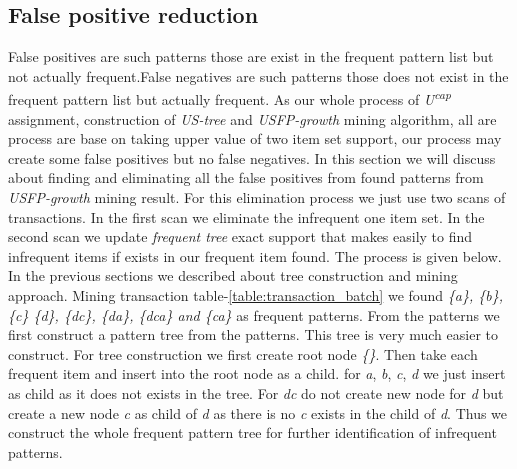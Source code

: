     \subsection{False positive reduction}
    False positives are such patterns those are exist in the frequent pattern list but not actually frequent.False negatives are such patterns those does not exist in the frequent pattern list but actually frequent. As our whole process of \emph{U\textsuperscript{cap}} assignment, construction of \emph{US-tree} and \emph{USFP-growth} mining algorithm, all are process are base on taking upper value of two item set support, our process may create some false positives but no false negatives. In this section we will discuss about finding and eliminating all the false positives from found patterns from \emph{USFP-growth} mining result. For this elimination process we just use two scans of transactions. In the first scan we eliminate the infrequent one item set. In the second scan we update \emph{frequent tree} exact support that makes easily to find infrequent items if exists in our frequent item found. The process is given below.\\
    In the previous sections we described about tree construction and mining approach. Mining transaction table-\ref{table:transaction_batch} we found \emph{\{a\}, \{b\}, \{c\} \{d\}, \{dc\}, \{da\}, \{dca\} and \{ca\}} as frequent patterns. From the patterns we first construct a pattern tree from the patterns. This tree is very much easier to construct. For tree construction we first create root node \emph{\{\}}. Then take each frequent item and insert into the root node as a child. for \emph{a}, \emph{b}, \emph{c}, \emph{d} we just insert as child as it does not exists in the tree. For \emph{dc} do not create new node for \emph{d} but create a new node \emph{c} as child of \emph{d} as there is no \emph{c} exists in the child of \emph{d}. Thus we construct the whole frequent pattern tree for further identification of infrequent patterns. \\

